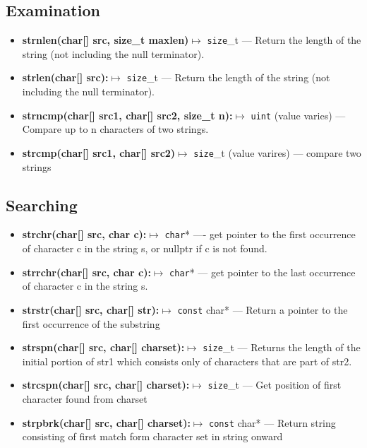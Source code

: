\documentclass{report}
\begin{document}
    \bigbreak \noindent 
    \subsection{Examination}
    \begin{itemize}
        \item \textbf{strnlen(char[] src, size\_t maxlen)}$\mapsto$ \texttt{size}\_t --- Return the length of the string (not including the null terminator).
        \item \textbf{strlen(char[] src):}$\mapsto$ \texttt{size}\_t --- Return the length of the string (not including the null terminator).
        \item \textbf{strncmp(char[] src1, char[] src2, size\_t n):}$\mapsto$ \texttt{uint} (value varies) --- Compare up to n characters of two strings.
        \item \textbf{strcmp(char[] src1, char[] src2)}$\mapsto$ \texttt{size}\_t (value varires) --- compare two strings
    \end{itemize}

    \bigbreak \noindent 
    \subsection{Searching}
    \begin{itemize}
        \item \textbf{strchr(char[] src, char c):}$\mapsto$ \texttt{char}* ---- get pointer to the first occurrence of character c in the string s, or nullptr if c is not found.
        \item \textbf{strrchr(char[] src, char c):}$\mapsto$ \texttt{char}* --- get pointer to the last occurrence of character c in the string s.
        \item \textbf{strstr(char[] src, char[] str):}$\mapsto$ \texttt{const} char* --- Return a pointer to the first occurrence of the substring 
        \item \textbf{strspn(char[] src, char[] charset):}$\mapsto$ \texttt{size}\_t --- Returns the length of the initial portion of str1 which consists only of characters that are part of str2.
        \item \textbf{strcspn(char[] src, char[] charset):}$\mapsto$ \texttt{size}\_t --- Get position of first character found from charset 
        \item \textbf{strpbrk(char[] src, char[] charset):}$\mapsto$ \texttt{const} char* --- Return string consisting of first match form character set in string onward
    \end{itemize}
\end{document}
